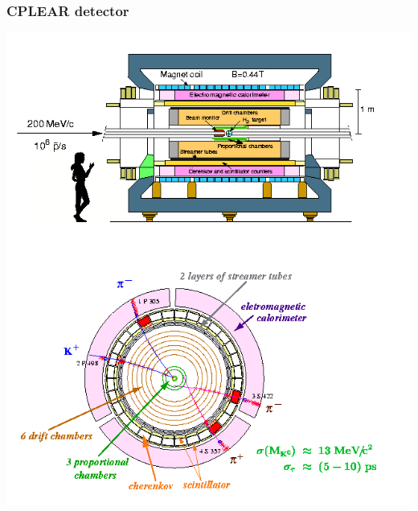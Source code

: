 \subsubsection{CPLEAR detector}
\begin{center}
  \includegraphics[height=0.7\textwidth,rotate=90]{figs/cplear.png}
\end{center}
